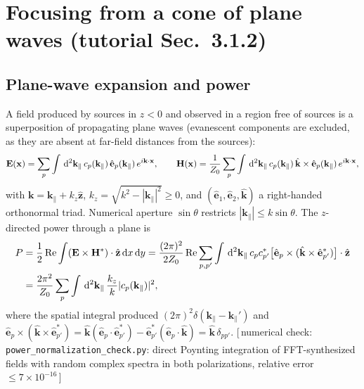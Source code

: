 \documentclass[11pt,letterpaper]{article}
\newcommand{\vect}[1]{\mathbf{#1}}
\newcommand{\Ev}{\vect{E}}
\newcommand{\Hv}{\vect{H}}
\newcommand{\xv}{\vect{x}}
\newcommand{\kv}{\vect{k}}
\newcommand{\kp}{\kv_{\parallel}}
\newcommand{\khat}{\hat{\kv}}
\newcommand{\zhat}{\hat{\vect{z}}}
\newcommand{\ep}{\hat{\vect{e}}_p}
\newcommand{\dkk}{\,{\rm d}^2\kp}
\renewcommand{\Re}{\operatorname{Re}}
\newcommand{\code}[1]{\texttt{\small #1}}
\newcommand{\numcheck}[1]{\hfill{\small\color{green!40!black}[\,numerical check: #1\,]}}
\begin{document}
\section{Focusing from a cone of plane waves (tutorial Sec.~3.1.2)}
\subsection{Plane-wave expansion and power}
A field produced by sources in $z<0$ and observed in a region free of sources is a superposition of propagating plane waves (evanescent components are excluded, as they are absent at far-field distances from the sources):
\begin{align}
    \Ev(\xv) = \sum_{p}\int \dkk\, c_p(\kp)\,\ep(\kp)\,e^{i\kv\cdot\xv}, \qquad
    \Hv(\xv) = \frac{1}{Z_0}\sum_{p}\int \dkk\, c_p(\kp)\,\khat\times\ep(\kp)\,e^{i\kv\cdot\xv},
    \label{eq:PW}
\end{align}
with $\kv=\kp+k_z\zhat$, $k_z=\sqrt{k^2-|\kp|^2}\ge0$, and $(\hat{\vect e}_1,\hat{\vect e}_2,\khat)$ a right-handed orthonormal triad. Numerical aperture $\sin\theta$ restricts $|\kp|\le k\sin\theta$. The $z$-directed power through a plane is
\begin{align}
    P &= \frac12\Re\int(\Ev\times\Hv^*)\cdot\zhat\,{\rm d}x\,{\rm d}y
    = \frac{(2\pi)^2}{2Z_0}\Re\sum_{p,p'}\int\dkk\, c_p c_{p'}^*\big[\ep\times(\khat\times\hat{\vect e}_{p'}^*)\big]\cdot\zhat \nonumber\\
    &= \frac{2\pi^2}{Z_0}\sum_p\int\dkk\,\frac{k_z}{k}|c_p(\kp)|^2,
    \label{eq:Power}
\end{align}
where the spatial integral produced $(2\pi)^2\delta(\kp-\kp')$ and $\ep\times(\khat\times\hat{\vect e}_{p'}^*)=\khat(\ep\cdot\hat{\vect e}_{p'}^*)-\hat{\vect e}_{p'}^*(\ep\cdot\khat)=\khat\,\delta_{pp'}$.
\numcheck{\code{power\_normalization\_check.py}: direct Poynting integration of FFT-synthesized fields with random complex spectra in both polarizations, relative error $\le7\times10^{-16}$}
\end{document}
